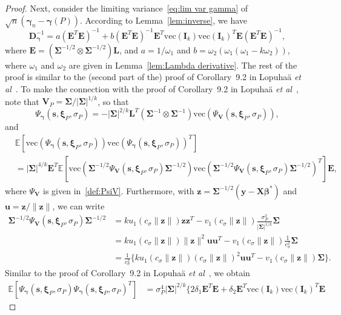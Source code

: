 \documentclass{article}
\numberwithin{equation}{section}
\theoremstyle{plain}
\newcommand{\vc}{\mathrm{vec}}
\newcommand{\bbeta}{\bm\beta}
\newcommand{\bxi}{\bm\xi}
\newcommand{\bgamma}{\bm\gamma}
\newcommand{\bSigma}{\mathbf{\Sigma}}
\newcommand{\by}{\mathbf{y}}
\newcommand{\bs}{\mathbf{s}}
\newcommand{\bu}{\mathbf{u}}
\newcommand{\bz}{\mathbf{z}}
\newcommand{\bX}{\mathbf{X}}
\newcommand{\bV}{\mathbf{V}}
\newcommand{\bI}{\mathbf{I}}
\newcommand{\bD}{\mathbf{D}}
\newcommand{\bL}{\mathbf{L}}
\newcommand{\bE}{\mathbf{E}}
\newcommand{\E}{\mathbb{E}}
\begin{document}
\begin{proof}
Next, consider the limiting variance~\eqref{eq:lim var gamma} of $\sqrt{n}(\bgamma_n-\bgamma(P))$. 
According to Lemma~\ref{lem:inverse}, we have
\begin{equation}
\label{eq:Dgammainv}
\bD_{\bgamma}^{-1}
=
a(\bE^T\bE)^{-1}
+
b
(\bE^T\bE)^{-1}
\bE^T\vc(\bI_k)\vc(\bI_k)^T\bE
(\bE^T\bE)^{-1},
\end{equation}
where $\bE=(\bSigma^{-1/2}\otimes\bSigma^{-1/2})\bL$, and 
$a=1/\omega_1$ and $b=\omega_2(\omega_1(\omega_1-k\omega_2))$,
where $\omega_1$ and $\omega_2$ are given in Lemma~\ref{lem:Lambda derivative}.
The rest of the proof is similar to the (second part of the) proof of Corollary~9.2 in Lopuha\"a \emph{et al}~\cite{lopuhaa-gares-ruizgazen2023}.
To make the connection with the proof of Corollary~9.2 in Lopuha\"a \emph{et al}~\cite{lopuhaa-gares-ruizgazen2023},
note that $\bV_P=\bSigma/|\bSigma|^{1/k}$, so that
\[
\Psi_{\bgamma}(\bs,\bxi_P,\sigma_P)
=
-
|\bSigma|^{2/k}
\bL^T
\left(
\bSigma^{-1}
\otimes
\bSigma^{-1}
\right)
\vc\left(
\Psi_\bV(\bs,\bxi_P,\sigma_P)
\right),
\]
and
\[
\begin{split}
&
\E\left[
\vc\left(\Psi_{\bgamma}(\bs,\bxi_P,\sigma_P)\right)
\vc\left(\Psi_{\bgamma}(\bs,\bxi_P,\sigma_P)\right)^T
\right]\\
&=
|\bSigma|^{4/k}
\bE^T
\E\left[
\vc\left(\bSigma^{-1/2}\Psi_{\bV}(\bs,\bxi_P,\sigma_P)\bSigma^{-1/2}\right)
\vc\left(\bSigma^{-1/2}\Psi_{\bV}(\bs,\bxi_P,\sigma_P)\bSigma^{-1/2}\right)^T
\right]
\bE,
\end{split}
\]
where $\Psi_\bV$ is given in~\eqref{def:PsiV}.
Furthermore, with $\bz=\bSigma^{-1/2}(\by-\bX\bbeta^*)$ and $\bu=\bz/\|\bz\|$,
we can write
\[
\begin{split}
\bSigma^{-1/2}\Psi_{\bV}(\bs,\bxi_P,\sigma_P)\bSigma^{-1/2}
&=
ku_1(c_\sigma\|\bz\|)\bz\bz^T
-
v_1(c_\sigma\|\bz\|)\frac{\sigma_P^2}{|\bSigma|^{1/k}}\bSigma\\
&=
ku_1(c_\sigma\|\bz\|)\|\bz\|^2\bu\bu^T
-
v_1(c_\sigma\|\bz\|)\frac{1}{c_\sigma^2}\bSigma\\
&=
\frac{1}{c_\sigma^2}
\Big\{
ku_1(c_\sigma\|\bz\|)(c_\sigma\|\bz\|)^2\bu\bu^T
-
v_1(c_\sigma\|\bz\|)\bSigma
\Big\}.
\end{split}
\]
Similar to the proof of Corollary~9.2 in Lopuha\"a \emph{et al}~\cite{lopuhaa-gares-ruizgazen2023}, we obtain
\[
\begin{split}
\E\left[
\Psi_{\bgamma}(\bs,\bxi_P,\sigma_P)
\Psi_{\bgamma}(\bs,\bxi_P,\sigma_P)^T
\right]
&=
\sigma_P^4|\bSigma|^{2/k}
\Big\{
2\delta_1\bE^T\bE
+
\delta_2
\bE^T\vc(\bI_k)\vc(\bI_k)^T\bE

\end{split}\]
\end{proof}
\end{document}
